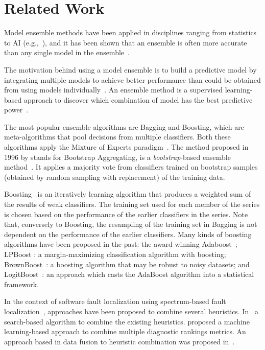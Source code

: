 \section{Related Work}
\label{sec-RelWork}
Model ensemble methods have been applied in disciplines ranging from statistics
to AI (e.g.,~\citep{breiman1996stacked,wolpert1992stacked}),
and it has been shown that an ensemble is often more accurate than any single
model in the ensemble~\citep{maclin2011popular}.

The motivation behind using a model ensemble is to build a predictive
model by integrating multiple models to achieve better performance
than could be obtained from using models
individually~\citep{maclin2011popular,rokach2010ensemble}. An ensemble
method is a supervised learning-based approach to discover which
combination of model has the best predictive
power~\citep{kuncheva2003measures}.

The most popular ensemble algorithms are Bagging and Boosting, which are meta-algorithms
that pool decisions from multiple classifiers. Both these algorithms apply the Mixture
of Experts paradigm~\citep{brown2010ensemble}.
%
The method proposed in 1996 by \cite{breiman1996stacked} stands for
Bootstrap Aggregating, is a \textit{bootstrap}-based ensemble
method~\citep{efron1994introduction}.  It applies a majority vote from
classifiers trained on bootstrap samples (obtained by random sampling
with replacement) of the training data.

Boosting~\citep{freund1996experiments,schapire1990strength} is an
iteratively learning algorithm that produces a weighted sum of the
results of weak classifiers. The training set used for each member of
the series is chosen based on the performance of the earlier
classifiers in the series. Note that, conversely to Boosting, the
resampling of the training set in Bagging is not dependent on the
performance of the earlier classifiers.  Many kinds of boosting
algorithms have been proposed in the past: the award winning
Adaboost~\citep{freund1996experiments}; LPBoost
\citep{demiriz2002linear}: a margin-maximizing classification
algorithm with boosting; BrownBoost~\cite{freund2001adaptive}: a
boosting algorithm that may be robust to noisy datasets; and
LogitBoost~\citep{friedman2000additive}: an approach which casts the
AdaBoost algorithm into a statistical framework.

In the context of software fault localization using spectrum-based
fault localization~\citep{abreu2007accuracy}, approaches have been
proposed to combine several heuristics. In~\citep{wang2011search} a
search-based algorithm to combine the existing
heuristics. \cite{xuan2014learning} proposed a machine learning-based
approach to combine multiple diagnostic rankings metrics. An approach
based in data fusion to heuristic combination was proposed
in~\citep{lo2014fusion}.

